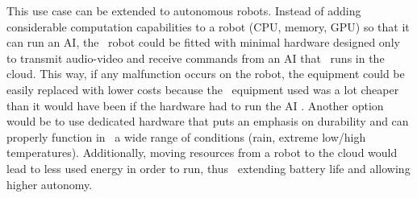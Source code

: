 This use case can be extended to autonomous robots.
Instead of adding considerable computation capabilities to a robot (CPU, memory, GPU) so that it can run an AI, the \
robot could be fitted with minimal hardware designed only to transmit audio-video and receive commands from an AI that \
runs in the cloud.
This way, if any malfunction occurs on the robot, the equipment could be easily replaced with lower costs because the \
equipment used was a lot cheaper than it would have been if the hardware had to run the AI .
Another option would be to use dedicated hardware that puts an emphasis on durability and can properly function in \
a wide range of conditions (rain, extreme low/high temperatures).
Additionally, moving resources from a robot to the cloud would lead to less used energy in order to run, thus \
extending battery life and allowing higher autonomy.


